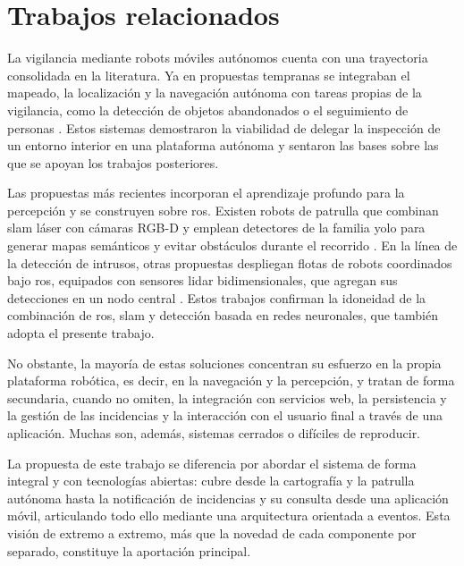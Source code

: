 \section{Trabajos relacionados}
\label{sec:trabajos-relacionados}

La vigilancia mediante robots móviles autónomos cuenta con una trayectoria
consolidada en la literatura. Ya en propuestas tempranas se integraban el
mapeado, la localización y la navegación autónoma con tareas propias de la
vigilancia, como la detección de objetos abandonados o el seguimiento de
personas \parencite{dipaola2010surveillance}. Estos sistemas demostraron la
viabilidad de delegar la inspección de un entorno interior en una plataforma
autónoma y sentaron las bases sobre las que se apoyan los trabajos posteriores.

Las propuestas más recientes incorporan el aprendizaje profundo para la
percepción y se construyen sobre \gls{ros}. Existen robots de patrulla que
combinan \gls{slam} láser con cámaras RGB-D y emplean detectores de la familia
\gls{yolo} para generar mapas semánticos y evitar obstáculos durante el recorrido
\parencite{chiang2026patrol}. En la línea de la detección de intrusos, otras
propuestas despliegan flotas de robots coordinados bajo \gls{ros}, equipados con
sensores \gls{lidar} bidimensionales, que agregan sus detecciones en un nodo
central \parencite{islam2020intruder}. Estos trabajos confirman la idoneidad de
la combinación de \gls{ros}, \gls{slam} y detección basada en redes neuronales,
que también adopta el presente trabajo.

No obstante, la mayoría de estas soluciones concentran su esfuerzo en la propia
plataforma robótica, es decir, en la navegación y la percepción, y tratan de
forma secundaria, cuando no omiten, la integración con servicios web, la
persistencia y la gestión de las incidencias y la interacción con el usuario
final a través de una aplicación. Muchas son, además, sistemas cerrados o
difíciles de reproducir.

La propuesta de este trabajo se diferencia por abordar el sistema de forma
integral y con tecnologías abiertas: cubre desde la cartografía y la patrulla
autónoma hasta la notificación de incidencias y su consulta desde una aplicación
móvil, articulando todo ello mediante una arquitectura orientada a eventos. Esta
visión de extremo a extremo, más que la novedad de cada componente por separado,
constituye la aportación principal.

